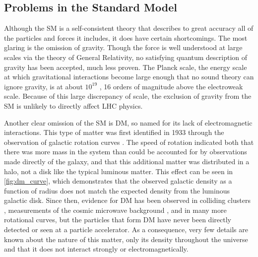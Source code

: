 \subsection{Problems in the Standard Model}
\label{sec:sm_problems}

Although the \ac{SM} is a self-consistent theory that describes to great accuracy all of the particles and forces it includes, it does have certain shortcomings. The most glaring is the omission of gravity. Though the force is well understood at large scales via the theory of General Relativity, no satisfying quantum description of gravity has been accepted, much less proven. The Planck scale, the energy scale at which gravitational interactions become large enough that no sound theory can ignore gravity, is at about $10^{19}$ \GeV, 16 orders of magnitude above the electroweak scale. Because of this large discrepancy of scale, the exclusion of gravity from the \ac{SM} is unlikely to directly affect \ac{LHC} physics. 

Another clear omission of the \ac{SM} is \acf{DM}, so named for its lack of electromagnetic interactions. This type of matter was first identified in 1933 through the observation of galactic rotation curves \cite{zwicky}. The speed of rotation indicated both that there was more mass in the system than could be accounted for by observations made directly of the galaxy, and that this additional matter was distributed in a halo, not a disk like the typical luminous matter. This effect can be seen in \autoref{fig:dm_curve}, which demonstrates that the observed galactic density as a function of radius does not match the expected density from the luminous galactic disk. Since then, evidence for \ac{DM} has been observed in colliding clusters \cite{astro-ph/0608407}, measurements of the cosmic microwave background \cite{0803.0732}, and in many more rotational curves, but the particles that form \ac{DM} have never been directly detected or seen at a particle accelerator. As a consequence, very few details are known about the nature of this matter, only its density throughout the universe and that it does not interact strongly or electromagnetically. 

